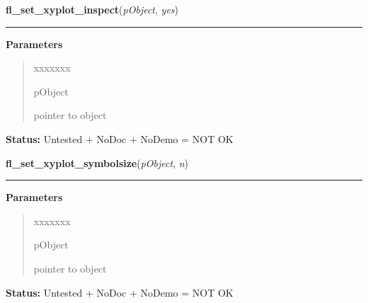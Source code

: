 \hspace{.8\funcindent}\begin{boxedminipage}{\funcwidth}

    \raggedright \textbf{fl\_set\_xyplot\_inspect}(\textit{pObject}, \textit{yes})

    \vspace{-1.5ex}

    \rule{\textwidth}{0.5\fboxrule}
\setlength{\parskip}{2ex}
\setlength{\parskip}{1ex}
      \textbf{Parameters}
      \vspace{-1ex}

      \begin{quote}
        \begin{Ventry}{xxxxxxx}

          \item[pObject]

          pointer to object

        \end{Ventry}

      \end{quote}

\textbf{Status:} Untested + NoDoc + NoDemo = NOT OK



    \end{boxedminipage}

    \label{xformslib:library:fl_set_xyplot_symbolsize}

    \vspace{0.5ex}

\hspace{.8\funcindent}\begin{boxedminipage}{\funcwidth}

    \raggedright \textbf{fl\_set\_xyplot\_symbolsize}(\textit{pObject}, \textit{n})

    \vspace{-1.5ex}

    \rule{\textwidth}{0.5\fboxrule}
\setlength{\parskip}{2ex}
\setlength{\parskip}{1ex}
      \textbf{Parameters}
      \vspace{-1ex}

      \begin{quote}
        \begin{Ventry}{xxxxxxx}

          \item[pObject]

          pointer to object

        \end{Ventry}

      \end{quote}

\textbf{Status:} Untested + NoDoc + NoDemo = NOT OK



    \end{boxedminipage}

